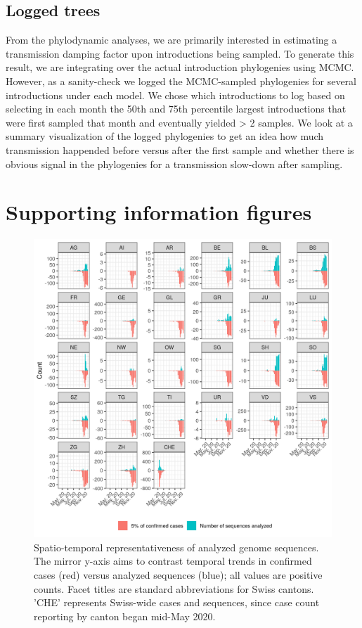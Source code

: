 \documentclass[9pt,twoside,lineno]{pnas-new}
\begin{document}
\subsection{Logged trees}
From the phylodynamic analyses, we are primarily interested in estimating a transmission damping factor upon introductions being sampled. To generate this result, we are integrating over the actual introduction phylogenies using MCMC. However, as a sanity-check we logged the MCMC-sampled phylogenies for several introductions under each model. We chose which introductions to log based on selecting in each month the 50th and 75th percentile largest introductions that were first sampled that month and eventually yielded > 2 samples. We look at a summary visualization of the logged phylogenies to get an idea how much transmission happended before versus after the first sample and whether there is obvious signal in the phylogenies for a transmission slow-down after sampling.

\newpage
\section{Supporting information figures}

\begin{figure}[H]
\centering
\includegraphics[width = 0.8\linewidth]{figures/CHE_downsampling.png}
\caption{Spatio-temporal representativeness of analyzed genome sequences. The mirror y-axis aims to contrast temporal trends in confirmed cases (red) versus analyzed sequences (blue); all values are positive counts. Facet titles are standard abbreviations for Swiss cantons. 'CHE' represents Swiss-wide cases and sequences, since case count reporting by canton began mid-May 2020.}  
\label{fig:downsampling_representativeness}
\end{figure}
\end{document}

